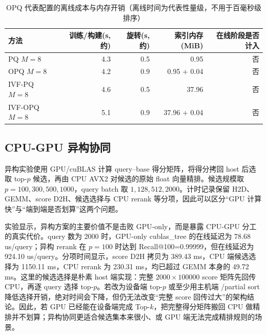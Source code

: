 \documentclass[a4paper,11pt,UTF8]{ctexart}
\newcommand{\code}[1]{\texttt{\detokenize{#1}}}
\begin{document}
\begin{table}[H]
  \centering\footnotesize
  \begin{tabular}{lrrrr}
    \toprule
    方法 & 训练/构建(s, 约) & 旋转(s, 约) & 索引内存(MiB) & 在线阶段是否计入 \\
    \midrule
    PQ $M=8$ & 4.3 & 0.5 & 0.95 & 否 \\
    OPQ $M=8$ & 4.2 & 0.9 & 0.95 + 0.04 & 否 \\
    IVF-PQ $M=8$ & 4.6 & 0.5 & 37.96 & 否 \\
    IVF-OPQ $M=8$ & 5.1 & 0.9 & 37.96 + 0.04 & 否 \\
    \bottomrule
  \end{tabular}
  \caption{OPQ 代表配置的离线成本与内存开销（离线时间为代表性量级，不用于百毫秒级排序）}
  \label{tab:opq-offline}
\end{table}


\subsection{CPU-GPU 异构协同}

异构实验使用 GPU/cuBLAS 计算 query--base 得分矩阵，将得分拷回 host 后选取 top-$p$ 候选，再由 CPU AVX2 对候选的原始 float 向量精排。候选规模取 $p=100,300,500,1000$，query batch 取 $1,128,512,2000$。计时记录保留 H2D、GEMM、score D2H、候选选择与 CPU rerank 等分项，因此可以区分“GPU 计算快”与“端到端是否划算”这两个问题。

实验显示，异构方案的主要价值不是击败 GPU-only，而是暴露 CPU-GPU 分工的真实代价。query 数为 2000 时，GPU-only cublas\_tree 的在线延迟为 78.68 us/query；异构 rerank 在 $p=100$ 时达到 Recall@100=0.99999，但在线延迟为 924.10 us/query。分项时间显示，score D2H 拷贝为 389.43 ms，CPU 端候选选择为 1150.11 ms，CPU rerank 为 230.31 ms，均已超过 GEMM 本身的 49.72 ms。这里的候选选择是朴素 host 端实现：完整 $2000\times100000$ score 矩阵先回传 CPU，再逐 query 选择 top-$p$。若改为设备端 top-$p$ 或至少用主机端 \code{nth\_element}/partial sort 降低选择开销，绝对时间会下降，但仍无法改变“完整 score 回传过大”的架构结论。因此，若 GPU 已经能在设备端完成 Top-$k$，把完整得分矩阵搬回 CPU 做精排并不划算；异构协同更适合候选集本来很小、或 GPU 端无法完成精排规则的场景。
\end{document}
